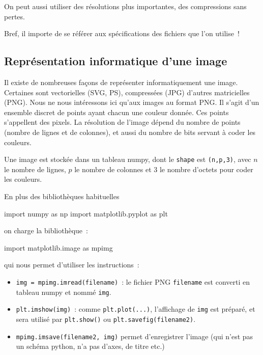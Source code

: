 \documentclass[10pt,fleqn]{article} %
\begin{document}
\begin{multicols}{2}
On peut aussi utiliser des résolutions plus importantes, des
compressions sans pertes. 

Bref, il importe de se référer aux spécifications des fichiers que l'on
utilise~!

\subsection*{Représentation informatique d'une image}

Il existe de nombreuses façons de représenter informatiquement une
image. Certaines sont vectorielles (SVG, PS), compressées (JPG) d'autres
matricielles (PNG). Nous ne nous intéressons ici qu'aux images au
format PNG. Il s'agit d'un ensemble
discret de points ayant chacun une couleur donnée. Ces points
s'appellent des pixels. La résolution de
l'image dépend du nombre de points (nombre de lignes et de colonnes),
et aussi du nombre de bits servant à coder les couleurs.

Une image est stockée dans un tableau numpy, dont le
\texttt{shape} est \texttt{(n,p,3)}, avec $n$ le nombre de lignes, $p$
le nombre de colonnes et $3$ le nombre d'octets pour coder les
couleurs. 


En plus des bibliothèques habituelles
\begin{python}
import numpy as np
import matplotlib.pyplot as plt
\end{python}
on charge la bibliothèque~:
\begin{python}
import matplotlib.image as mpimg
\end{python}
qui nous permet d'utiliser les instructions~: 
\begin{itemize}
\item 
  \verb#img = mpimg.imread(filename)#~: le fichier PNG \verb#filename#
  est converti en tableau numpy et nommé \verb#img#.
\item 
  \verb#plt.imshow(img)#~: comme \verb#plt.plot(...)#, l'affichage de
  \verb#img# est préparé, et sera utilisé par \verb#plt.show()# ou
  \verb#plt.savefig(filename2)#.
\item
  \verb#mpimg.imsave(filename2, img)# permet d'enregistrer l'image
  (qui n'est pas un schéma python, n'a pas d'axes, de titre etc.)
\end{itemize}


\end{multicols}
\end{document}
